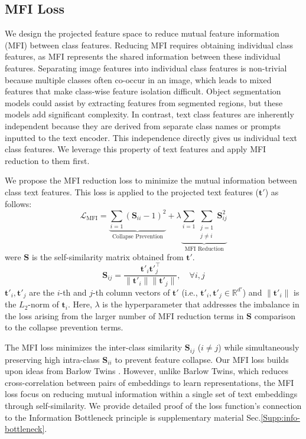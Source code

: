 \subsection{MFI Loss}
\label{sec: Local Features - MFI Reduction}
We design the projected feature space to reduce mutual feature information (MFI) between class features. Reducing MFI requires obtaining individual class features, as MFI represents the shared information between these individual features. Separating image features into individual class features is non-trivial because multiple classes often co-occur in an image, which leads to mixed features that make class-wise feature isolation difficult. Object segmentation models could assist by extracting features from segmented regions, but these models add significant complexity. In contrast, text class features are inherently independent because they are derived from separate class names or prompts inputted to the text encoder. This independence directly gives us individual text class features. We leverage this property of text features and apply MFI reduction to them first.

We propose the MFI reduction loss to minimize the mutual information between class text features. This loss is applied to the projected text features ($\mathbf{t'}$) as follows:
%
\begin{equation}
\label{eq:mfi}
\mathcal{L}_{\text{MFI}} = \underbrace{\sum_{i=1} \left( \mathbf{S}_{ii} - 1 \right)^2}_{\text{Collapse Prevention}} + \lambda \underbrace{\sum_{i=1} \sum_{\substack{j=1 \\ j \neq i}} \mathbf{S}_{ij}^2}_{\text{MFI Reduction}}
\end{equation}
were $\mathbf{S}$ is the self-similarity matrix obtained from $\mathbf{t'}$.
\[
\mathbf{S}_{ij} = \frac{\mathbf{t'}_i \mathbf{t'}_j^\top}{\|\mathbf{t'}_i\| \|\mathbf{t'}_j\|}, \quad \forall i, j 
\]
% 
\( \mathbf{t'}_i, \mathbf{t'}_j \) are the \( i \)-th and \( j \)-th column vectors of \( \mathbf{t'} \) (i.e., \( \mathbf{t'}_i, \mathbf{t'}_j \in \mathbb{R}^{d'} \)) and  \( \|\mathbf{t'}_i\| \) is the \( L_2 \)-norm of \( \mathbf{t}_i \). Here, \( \lambda \) is the hyperparameter that addresses the imbalance in the loss arising from the larger number of MFI reduction terms in \( \mathbf{S} \) comparison to the collapse prevention terms.

The MFI loss minimizes the inter-class similarity \( \mathbf{S}_{ij} \) (\( i \neq j \)) while simultaneously preserving high intra-class \( \mathbf{S}_{ii} \) to prevent feature collapse. Our MFI loss builds upon ideas from Barlow Twins \cite{barlowtwins}. However, unlike Barlow Twins, which reduces cross-correlation between pairs of embeddings to learn representations, the MFI loss focus on reducing mutual information within a single set of text embeddings through self-similarity. We provide detailed proof of the loss function's connection to the Information Bottleneck principle is supplementary material Sec.\ref{Supp:info-bottleneck}.


